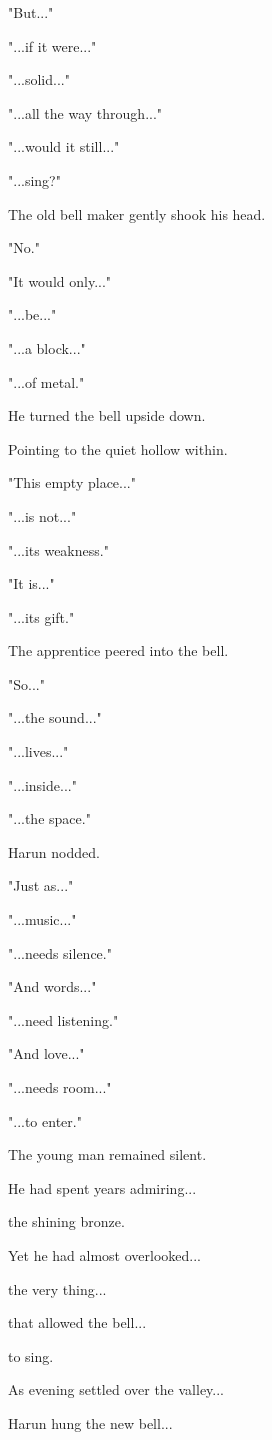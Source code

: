 \documentclass[12pt,openany]{book}
\begin{document}
"But..."

"...if it were..."

"...solid..."

"...all the way through..."

"...would it still..."

"...sing?"

The old bell maker gently shook his head.

"No."

"It would only..."

"...be..."

"...a block..."

"...of metal."

He turned the bell upside down.

Pointing to the quiet hollow within.

"This empty place..."

"...is not..."

"...its weakness."

"It is..."

"...its gift."

The apprentice peered into the bell.

"So..."

"...the sound..."

"...lives..."

"...inside..."

"...the space."

Harun nodded.

"Just as..."

"...music..."

"...needs silence."

"And words..."

"...need listening."

"And love..."

"...needs room..."

"...to enter."

The young man remained silent.

He had spent years admiring...

the shining bronze.

Yet he had almost overlooked...

the very thing...

that allowed the bell...

to sing.

As evening settled over the valley...

Harun hung the new bell...
\end{document}

